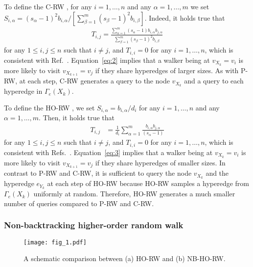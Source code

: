 To define the C-RW \cite{carletti2020}, for any $i=1, \ldots, n$ and any $\alpha = 1, \ldots, m$ we set $S_{i, \alpha} = (s_{\alpha} - 1)^2 b_{i,\alpha} / \left[\sum_{\beta=1}^m (s_{\beta} - 1)^2 b_{i,\beta}\right]$.
Indeed, it holds true that
\begin{align}
T_{i,j} = \frac{\sum_{\alpha=1}^m (s_{\alpha} - 1) b_{i, \alpha} b_{j, \alpha}} {\sum_{\beta=1}^m (s_{\beta} - 1)^2 b_{i, \beta}}
\label{eq:2}
\end{align}
for any $1 \leq i, j \leq n$ such that $i \neq j$, and $T_{i,i} = 0$ for any $i = 1, \ldots, n$, which is consistent with Ref.~\cite{carletti2020}.
Equation~\eqref{eq:2} implies that a walker being at $v_{X_k} = v_i$ is more likely to visit $v_{X_{k+1}} = v_j$ if they share hyperedges of larger sizes.
As with P-RW, at each step, C-RW generates a query to the node $v_{X_k}$ and a query to each hyperedge in $\Gamma_e(X_{k})$.


To define the HO-RW \cite{banerjee2021, luo2024, traversa2024}, we set $S_{i, \alpha} = b_{i, \alpha} / d_i$ for any $i=1, \ldots, n$ and any $\alpha = 1, \ldots, m$.
Then, it holds true that
\begin{align}
T_{i,j} &= \frac{1}{d_i} \sum_{\alpha=1}^m \frac{b_{i,\alpha} b_{j,\alpha}}{(s_{\alpha} - 1)}
\label{eq:3}
\end{align}
for any $1 \leq i, j \leq n$ such that $i \neq j$, and $T_{i,i} = 0$ for any $i = 1, \ldots, n$, which is consistent with Refs.~\cite{banerjee2021, luo2024, traversa2024}.
Equation~\eqref{eq:3} implies that a walker being at $v_{X_k} = v_i$ is more likely to visit $v_{X_{k+1}} = v_j$ if they share hyperedges of smaller sizes.
In contrast to P-RW and C-RW, it is sufficient to query the node $v_{X_k}$ and the hyperedge $e_{Y_k}$ at each step of HO-RW because HO-RW samples a hyperedge from $\Gamma_e(X_{k})$ uniformly at random.
Therefore, HO-RW generates a much smaller number of queries compared to P-RW and C-RW.

\subsubsection{Non-backtracking higher-order random walk}

\begin{figure}[t]
    \centering
    \texttt{[image: fig\_1.pdf]}\\
    \caption{A schematic comparison between (a) HO-RW and (b) NB-HO-RW.}
\label{fig:1}
\end{figure}


